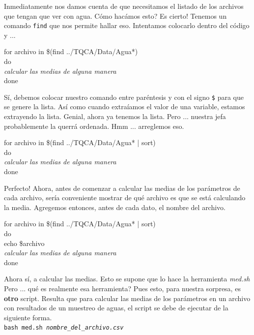 \documentclass[10pt,letterpaper]{article}
\newcommand{\inlinecode}[1]{
\colorbox{light-gray}{\texttt{#1}}
}
\newenvironment{Code}
{
\begin{lrbox}{\selvestebox}%
\begin{minipage}{\dimexpr\columnwidth-2\fboxsep\relax}
\fontfamily{\ttdefault}\selectfont
}
{\end{minipage}\end{lrbox}%
\begin{center}
\colorbox{light-gray}{\usebox{\selvestebox}}
\end{center}
}
\begin{document}
Inmediatamente nos damos cuenta de que necesitamos el listado de los archivos que tengan que ver con agua. C\'omo hac\'amos esto? Es cierto! Tenemos un comando \inlinecode{find} que nos permite hallar eso. Intentamos colocarlo dentro del c\'odigo y ...

\begin{Code}
for archivo in \$(find ../TQCA/Data/Agua*)\\
do\\
\emph{calcular las medias de alguna manera}\\
done
\end{Code}

S\'i, debemos colocar nuestro comando entre par\'entesis y con el signo \inlinecode{\$} para que se genere la lista. As\'i como cuando extra\'iamos el valor de una variable, estamos extrayendo la lista. Genial, ahora ya tenemos la lista. Pero ... nuestra jefa probablemente la querr\'a ordenada. Hmm ... arreglemos eso.

\begin{Code}
for archivo in \$(find ../TQCA/Data/Agua* | sort)\\
do\\
\emph{calcular las medias de alguna manera}\\
done
\end{Code}

Perfecto! Ahora, antes de comenzar a calcular las medias de los par\'ametros de cada archivo, ser\'ia conveniente mostrar de qu\'e archivo es que se est\'a calculando la media. Agregemos entonces, antes de cada dato, el nombre del archivo.

\begin{Code}
for archivo in \$(find ../TQCA/Data/Agua* | sort)\\
do\\
echo \$archivo\\
\emph{calcular las medias de alguna manera}\\
done
\end{Code}

Ahora s\'i, a calcular las medias. Esto se supone que lo hace la herramienta \emph{med.sh} Pero ... qu\'e es realmente esa herramienta? Pues esto, para nuestra sorpresa, es \textbf{otro} script. Resulta que para calcular las medias de los par\'ametros en un archivo con resultados de un muestreo de aguas, el script se debe de ejecutar de la siguiente forma.\\
\inlinecode{bash med.sh \emph{nombre\_del\_archivo.csv}}\\
\end{document}
